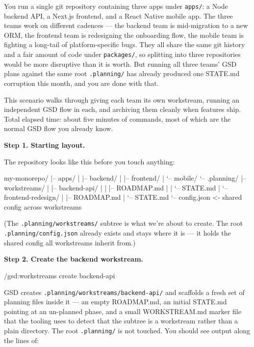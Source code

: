 \documentclass[11pt,letterpaper,openany]{book}
\begin{document}
\begin{gsdscenario}

You run a single git repository containing three apps under
\texttt{apps/}: a Node backend API, a Next.js frontend, and a React
Native mobile app. The three teams work on different cadences ---
the backend team is mid-migration to a new ORM, the frontend team
is redesigning the onboarding flow, the mobile team is fighting a
long-tail of platform-specific bugs. They all share the same git
history and a fair amount of code under \texttt{packages/}, so
splitting into three repositories would be more disruptive than it
is worth. But running all three teams' GSD plans against the same
root \texttt{.planning/} has already produced one STATE.md corruption
this month, and you are done with that.

This scenario walks through giving each team its own workstream,
running an independent GSD flow in each, and archiving them cleanly
when features ship. Total elapsed time: about five minutes of
commands, most of which are the normal GSD flow you already know.

\textbf{Step 1. Starting layout.}

The repository looks like this before you touch anything:

\begin{gsdplain}
my-monorepo/
|-- apps/
|   |-- backend/
|   |-- frontend/
|   `-- mobile/
`-- .planning/
    |-- workstreams/
    |   |-- backend-api/
    |   |   |-- ROADMAP.md
    |   |   `-- STATE.md
    |   `-- frontend-redesign/
    |       |-- ROADMAP.md
    |       `-- STATE.md
    `-- config.json       <- shared config across workstreams
\end{gsdplain}

\noindent
(The \texttt{.planning/workstreams/} subtree is what we're about to
create. The root \texttt{.planning/config.json} already exists and
stays where it is --- it holds the shared config all workstreams
inherit from.)

\textbf{Step 2. Create the backend workstream.}

\begin{gsdbash}
/gsd:workstreams create backend-api
\end{gsdbash}

\noindent
GSD creates \texttt{.planning/workstreams/backend-api/} and
scaffolds a fresh set of planning files inside it --- an empty
ROADMAP.md, an initial STATE.md pointing at an un-planned phase,
and a small WORKSTREAM.md marker file that the tooling uses to
detect that the subtree is a workstream rather than a plain
directory. The root \texttt{.planning/} is not touched. You should
see output along the lines of:


\end{gsdscenario}
\end{document}
